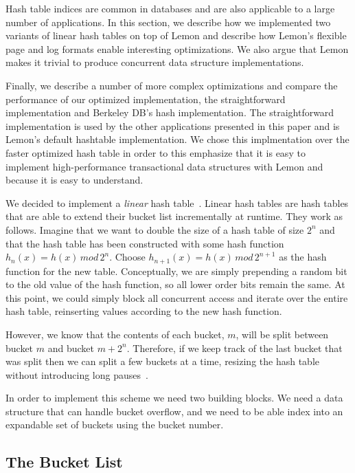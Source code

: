 \documentclass[letterpaper,twocolumn,english]{article}
\newcommand{\yad}{Lemon\xspace}
\begin{document}
Hash table indices are common in databases and are also applicable to
a large number of applications.  In this section, we describe how we
implemented two variants of linear hash tables on top of \yad and
describe how \yad's flexible page and log formats enable interesting
optimizations.  We also argue that \yad makes it trivial to produce
concurrent data structure implementations.

Finally, we describe a number of more complex optimizations and
compare the performance of our optimized implementation, the
straightforward implementation and Berkeley DB's hash implementation.
The straightforward implementation is used by the other applications
presented in this paper and is \yad's default hashtable
implementation.  We chose this implmentation over the faster optimized
hash table in order to this emphasize that it is easy to implement
high-performance transactional data structures with \yad and because
it is easy to understand.

We decided to implement a {\em linear} hash table~\cite{lht}.  Linear hash tables are
hash tables that are able to extend their bucket list incrementally at
runtime. They work as follows. Imagine that we want to double the size
of a hash table of size $2^{n}$ and that the hash table has been
constructed with some hash function $h_{n}(x)=h(x)\, mod\,2^{n}$.
Choose $h_{n+1}(x)=h(x)\, mod\,2^{n+1}$ as the hash function for the
new table. Conceptually, we are simply prepending a random bit to the
old value of the hash function, so all lower order bits remain the
same. At this point, we could simply block all concurrent access and
iterate over the entire hash table, reinserting values according to
the new hash function.

However, 
we know that the
contents of each bucket, $m$, will be split between bucket $m$ and
bucket $m+2^{n}$. Therefore, if we keep track of the last bucket that
was split then we can split a few buckets at a time, resizing the hash
table without introducing long pauses~\cite{lht}. 

In order to implement this scheme we need two building blocks.  We
need a data structure that can handle bucket overflow, and we need to
be able index into an expandable set of buckets using the bucket
number.

\subsection{The Bucket List}
\end{document}
